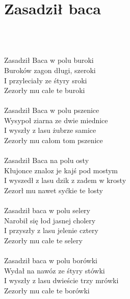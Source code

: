 \documentclass[a5paper, 10pt]{book}
\begin{document}


\newpage
\section{Zasadził baca}\textcolor{lightgray}{\textit{}}\\~\\
\begin{minipage}[t]{0.8\textwidth}
  Zasadził Baca w polu buroki\\
  Buroków zagon długi, szeroki\\
  I przyleciały ze śtyry sroki\\
  Zezorły mu całe te buroki\\
  \\
  Zasadził Baca w polu pszenice\\
  Wysypoł ziarna ze dwie miednice\\
  I wyszły z lasu żubrze samice\\
  Zezorły mu całom tom pszenice\\
  \\
  Zasadził Baca na polu osty\\
  Kłujonce znaloz je kajś pod mostym\\
  I wyszedł z lasu dzik z zadem w krosty\\
  Zezorł mu nawet syćkie te łosty\\
  \\
  Zasadził baca w polu selery\\
  Narobił się łod jasnej cholery\\
  I przyszły z lasu jelenie cztery\\
  Zezorły mu całe te selery\\
  \\
  Zasadził baca w polu borówki\\
  Wydał na nawóz ze śtyry stówki\\
  I wyszły z lasu dwieście trzy mrówki\\
  Zezorły mu całe te borówki\\

\end{minipage}
\end{document}
